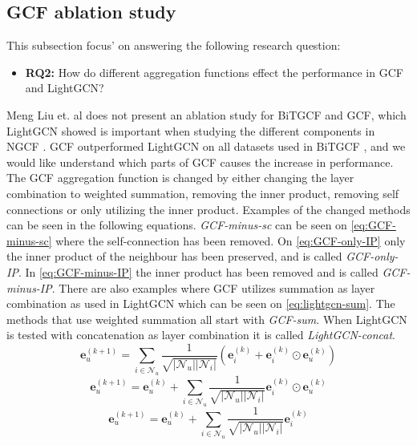 \subsection{GCF ablation study}\label{subsec:gcf-ablation-study}
This subsection focus' on answering the following research question: 
\begin{itemize}
    \item \textbf{RQ2:} How do different aggregation functions effect the performance in GCF and LightGCN?
\end{itemize}
Meng Liu et. al does not present an ablation study for BiTGCF and GCF, which LightGCN showed is important when studying the different components in NGCF \cite{lightgcn,BiTGCF}.
GCF outperformed LightGCN on all datasets used in BiTGCF \cite{BiTGCF}, and we would like understand which parts of GCF causes the increase in performance.
The GCF aggregation function is changed by either changing the layer combination to weighted summation, removing the inner product, removing self connections or only utilizing the inner product.
Examples of the changed methods can be seen in the following equations.
\textit{GCF-minus-sc} can be seen on \autoref{eq:GCF-minus-sc} where the self-connection has been removed.
On \autoref{eq:GCF-only-IP} only the inner product of the neighbour has been preserved, and is called \textit{GCF-only-IP}.
In \autoref{eq:GCF-minus-IP} the inner product has been removed and is called \textit{GCF-minus-IP}.
There are also examples where GCF utilizes summation as layer combination as used in LightGCN which can be seen on \autoref{eq:lightgcn-sum}.
The methods that use weighted summation all start with \textit{GCF-sum}.
When LightGCN is tested with concatenation as layer combination it is called \textit{LightGCN-concat}.
\begin{equation}
    \mathbf{e}_{u}^{(k+1)} = \sum^{}_{i \in \mathcal{N}_u}  \frac{1}{\sqrt{|\mathcal{N}_u||\mathcal{N}_i|}}\left( \mathbf{e}_i^{(k)} + \mathbf{e}_i^{(k)} \odot \mathbf{e}_u^{(k)} \right)
    \label{eq:GCF-minus-sc}
\end{equation}
\begin{equation}
    \mathbf{e}_{u}^{(k+1)} = \mathbf{e}_{u}^{(k)} + \sum^{}_{i \in \mathcal{N}_u}  \frac{1}{\sqrt{|\mathcal{N}_u||\mathcal{N}_i|}} \mathbf{e}_i^{(k)} \odot \mathbf{e}_u^{(k)}
    \label{eq:GCF-only-IP}
\end{equation}
\begin{equation}
    \mathbf{e}_{u}^{(k+1)} = \mathbf{e}_{u}^{(k)} + \sum^{}_{i \in \mathcal{N}_u}  \frac{1}{\sqrt{|\mathcal{N}_u||\mathcal{N}_i|}} \mathbf{e}_i^{(k)}
    \label{eq:GCF-minus-IP}
\end{equation}
